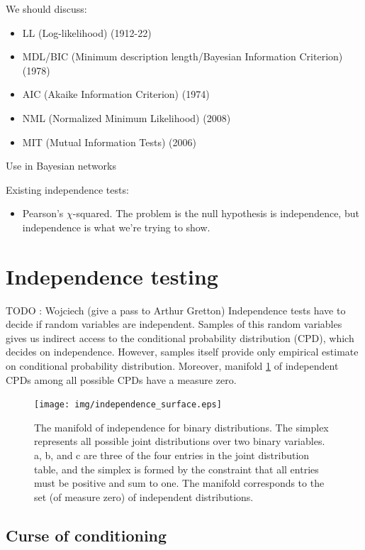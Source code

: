 \documentclass{article} %
\begin{document}
We should discuss:
\begin{itemize}
\item LL (Log-likelihood) (1912-22)
\item MDL/BIC (Minimum description length/Bayesian Information Criterion) (1978)
\item AIC (Akaike Information Criterion) (1974)
\item NML (Normalized Minimum Likelihood) (2008)
\item MIT (Mutual Information Tests) (2006)
\end{itemize}
Use in Bayesian networks \cite{schafer2005empirical}

Existing independence tests:
\begin{itemize}
\item Pearson's $\chi$-squared.  The problem is the null hypothesis is independence, but independence is what we're trying to show.
\end{itemize}

\cite{margaritis2003learning}

\section{Independence testing} TODO : Wojciech (give a pass to Arthur Gretton)
Independence tests have to decide if random variables are independent.
Samples of this random variables gives us indirect access to the conditional probability
distribution (CPD), which decides on independence. However, samples itself
provide only empirical estimate on conditional probability distribution. 
Moreover, manifold \ref{fig:ind} of independent CPDs among all possible CPDs
have a measure zero. 


\begin{figure}[h]
\centering
\texttt{[image: img/independence\_surface.eps]}
\caption{The manifold of independence for binary distributions. The simplex represents all possible joint distributions over two binary variables.  a, b, and c are three of the four entries in the joint distribution table, and the simplex is formed by the constraint that all entries must be positive and sum to one.  The manifold corresponds to the set (of measure zero) of independent distributions.}
\label{fig:ind}
\end{figure}

\subsection{Curse of conditioning}
\end{document}
